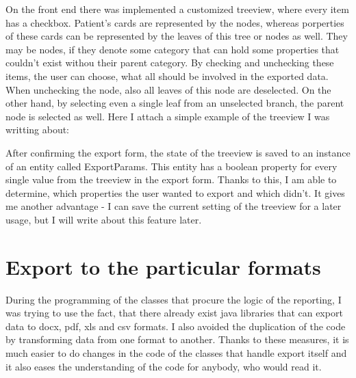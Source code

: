 \documentclass[thesis=B,english]{FITthesis}[2012/10/20]
\begin{document}
On the front end there was implemented a customized treeview, where every item has a checkbox. Patient's cards are represented by the nodes, whereas porperties of these cards can be represented by the leaves of this tree or nodes as well. They may be nodes, if they denote some category that can hold some properties that couldn't exist withou their parent category. By checking and unchecking these items, the user can choose, what all should be involved in the exported data. When unchecking the node, also all leaves of this node are deselected. On the other hand, by selecting even a single leaf from an unselected branch, the parent node is selected as well.
Here I attach a simple example of the treeview I was writting about:


\begin{figure}[h]
\end{figure}

After confirming the export form, the state of the treeview is saved to an instance of an entity called ExportParams. This entity has a boolean property for every single value from the treeview in the export form. Thanks to this, I am able to determine, which properties the user wanted to export and which didn't. It gives me another advantage - I can save the current setting of the treeview for a later usage, but I will write about this feature later.

\section{Export to the particular formats}
During the  programming of the classes that procure the logic of the reporting, I was trying to use the fact, that there already exist java libraries that can export data to docx, pdf, xls and csv formats. I also avoided the duplication of the code by transforming data from one format to another. Thanks to these measures, it is much easier to do changes in the code of the classes that handle export itself and it also eases the understanding of the code for anybody, who would read it.
\end{document}
